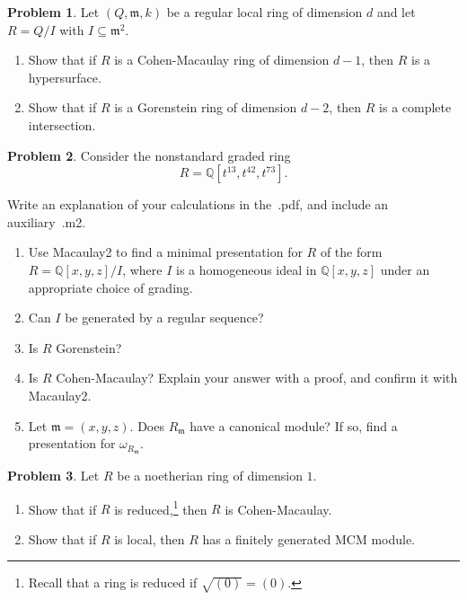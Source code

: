 \documentclass[11pt]{article}
\newcommand{\m}{\mathfrak{m}}
\theoremstyle{definition}
\newtheorem{problem}{Problem}
\begin{document}
\vspace{0.5em}

\begin{problem}
	Let $(Q, \m, k)$ be a regular local ring of dimension $d$ and let $R = Q/I$ with $I \subseteq \m^2$.
		
		\vspace{-0.3em}
	\begin{enumerate}[label=\alph*), itemsep=-0.1em]
		\item Show that if $R$ is a Cohen-Macaulay ring of dimension $d-1$, then $R$ is a hypersurface.
		\item Show that if $R$ is a Gorenstein ring of dimension $d-2$, then $R$ is a complete intersection.
	\end{enumerate}
\end{problem}



\vspace{0.5em}

\begin{problem}
Consider the nonstandard graded ring
\[ R = \mathbb{Q}[t^{13}, t^{42}, t^{73}].\]

Write an explanation of your calculations in the~.pdf, and include an auxiliary~.m2.
	
	\vspace{-0.3em}
	\begin{enumerate}[label=\alph*), itemsep=-0.1em]
		\item Use Macaulay2 to find a minimal presentation for $R$ of the form $R=\mathbb{Q}[x,y,z]/I$, where $I$ is a homogeneous ideal in $\mathbb{Q}[x,y,z]$ under an appropriate choice of grading.
		\item Can $I$ be generated by a regular sequence?
		\item Is $R$ Gorenstein?
		\item Is $R$ Cohen-Macaulay? Explain your answer with a proof, and confirm it with Macaulay2.
		\item Let $\m = (x,y,z)$. Does $R_\m$ have a canonical module? If so, find a presentation for $\omega_{R_\m}$.
	\end{enumerate}
\end{problem}


\vspace{0.5em}


\begin{problem}
	Let $R$ be a noetherian ring of dimension $1$.
	
	\vspace{-0.3em}
	\begin{enumerate}[label=\alph*), itemsep=-0.1em]
		\item Show that if $R$ is reduced,\footnote{Recall that a ring is reduced if $\sqrt{(0)} = (0)$.} then $R$ is Cohen-Macaulay.
		\item Show that if $R$ is local, then $R$ has a finitely generated MCM module.
	\end{enumerate}
\end{problem}

\vspace{1em}
\end{document}
